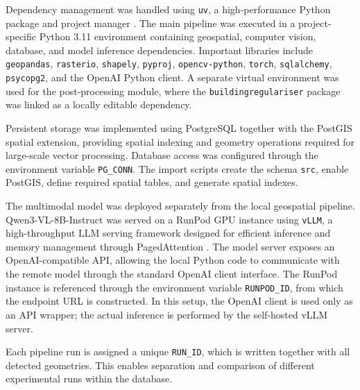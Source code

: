 Dependency management was handled using \texttt{uv}, a high-performance Python package and project manager \citep{uv_docs}. The main pipeline was executed in a project-specific Python 3.11 environment containing geospatial, computer vision, database, and model inference dependencies. Important libraries include \texttt{geopandas}, \texttt{rasterio}, \texttt{shapely}, \texttt{pyproj}, \texttt{opencv-python}, \texttt{torch}, \texttt{sqlalchemy}, \texttt{psycopg2}, and the OpenAI Python client. A separate virtual environment was used for the post-processing module, where the \texttt{buildingregulariser} package was linked as a locally editable dependency.

Persistent storage was implemented using PostgreSQL together with the PostGIS spatial extension, providing spatial indexing and geometry operations required for large-scale vector processing. Database access was configured through the environment variable \texttt{PG\_CONN}. The import scripts create the schema \texttt{src}, enable PostGIS, define required spatial tables, and generate spatial indexes.

The multimodal model was deployed separately from the local geospatial pipeline. Qwen3-VL-8B-Instruct was served on a RunPod GPU instance using \texttt{vLLM}, a high-throughput LLM serving framework designed for efficient inference and memory management through PagedAttention \citep{kwon2023pagedattention}. The model server exposes an OpenAI-compatible API, allowing the local Python code to communicate with the remote model through the standard OpenAI client interface. The RunPod instance is referenced through the environment variable \texttt{RUNPOD\_ID}, from which the endpoint URL is constructed. In this setup, the OpenAI client is used only as an API wrapper; the actual inference is performed by the self-hosted vLLM server.

Each pipeline run is assigned a unique \texttt{RUN\_ID}, which is written together with all detected geometries. This enables separation and comparison of different experimental runs within the database.
